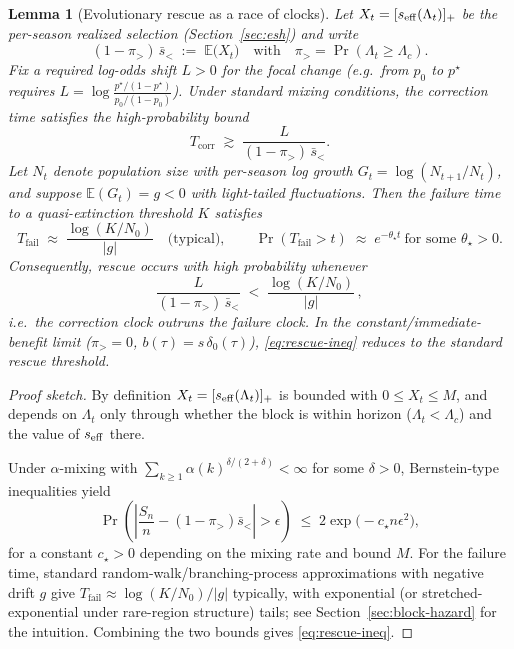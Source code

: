 \documentclass[11pt]{article}
\theoremstyle{upright}
\newtheorem{lemma}{Lemma}
\newcommand{\seff}[1][]{s_{\mathrm{eff}\if\relax\detokenize{#1}\relax\else,#1\fi}}
\begin{document}
\begin{lemma}[Evolutionary rescue as a race of clocks]\label{lem:rescue}
Let $X_t=[\seff(\Lambda_t)]_+$ be the per-season realized selection (Section~\ref{sec:esh}) and write
\[
(1-\pi_{>})\,\bar s_{<} \;:=\; \mathbb E\!\big(X_t\big) \quad\text{with}\quad \pi_{>}=\Pr(\Lambda_t\ge \Lambda_c).
\]
Fix a required log-odds shift $L>0$ for the focal change (e.g.\ from $p_0$ to $p^\star$ requires $L=\log\!\frac{p^\star/(1-p^\star)}{p_0/(1-p_0)}$). Under standard mixing conditions,
the \emph{correction time} satisfies the high-probability bound
\[
T_{\mathrm{corr}} \;\gtrsim\; \frac{L}{(1-\pi_{>})\,\bar s_{<}}.
\]
Let $N_t$ denote population size with per-season log growth $G_t=\log(N_{t+1}/N_t)$, and suppose $\mathbb E(G_t)=g<0$ with light-tailed fluctuations. Then the \emph{failure time} to a quasi-extinction threshold $K$ satisfies
\[
T_{\mathrm{fail}} \;\approx\; \frac{\log(K/N_0)}{|g|} \quad\text{(typical)},\qquad
\Pr(T_{\mathrm{fail}}>t)\;\approx\; e^{-\theta_\star t}\ \text{for some }\theta_\star>0.
\]
Consequently, \emph{rescue occurs with high probability} whenever
\begin{equation}\label{eq:rescue-ineq}
\frac{L}{(1-\pi_{>})\,\bar s_{<}} \;<\; \frac{\log(K/N_0)}{|g|}\,,
\end{equation}
i.e.\ the correction clock outruns the failure clock. In the constant/immediate-benefit limit ($\pi_{>}=0$, $b(\tau)=s\,\delta_0(\tau)$), \eqref{eq:rescue-ineq} reduces to the standard rescue threshold.
\end{lemma}

\begin{proof}[Proof sketch]
By definition $X_t=[\seff(\Lambda_t)]_+$ is bounded with $0\le X_t\le M$,
and depends on $\Lambda_t$ only through whether the block is within horizon ($\Lambda_t<\Lambda_c$) and the value of $\seff$ there.

Under $\alpha$-mixing with $\sum_{k\ge1}\alpha(k)^{\delta/(2+\delta)}<\infty$ for some $\delta>0$, Bernstein-type inequalities yield
\[
\Pr\!\left(\left|\frac{S_n}{n}-(1-\pi_{>})\bar s_{<}\right|>\epsilon\right)\;\le\; 2\exp\!\Big(-c_\star n\epsilon^2\Big),
\]
for a constant $c_\star>0$ depending on the mixing rate and bound $M$. For the failure time, standard random-walk/branching-process approximations with negative drift $g$ give $T_{\mathrm{fail}}\approx \log(K/N_0)/|g|$ typically, with exponential (or stretched-exponential under rare-region structure) tails; see Section~\ref{sec:block-hazard} for the intuition. Combining the two bounds gives \eqref{eq:rescue-ineq}.


\end{proof}
\end{document}
